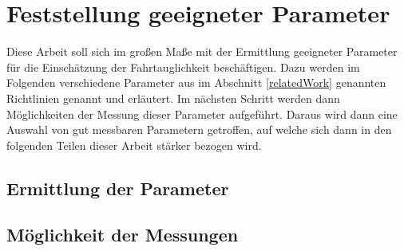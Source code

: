 \section{Feststellung geeigneter Parameter}
\label{parameters}
Diese Arbeit soll sich im großen Maße mit der Ermittlung geeigneter Parameter für die Einschätzung der Fahrtauglichkeit beschäftigen. Dazu werden im Folgenden verschiedene Parameter aus im Abschnitt \ref{relatedWork} genannten Richtlinien genannt und erläutert. Im nächsten Schritt werden dann Möglichkeiten der Messung dieser Parameter aufgeführt. Daraus wird dann eine Auswahl von gut messbaren Parametern getroffen, auf welche sich dann in den folgenden Teilen dieser Arbeit stärker bezogen wird.
\subsection{Ermittlung der Parameter}
\subsection{Möglichkeit der Messungen}
